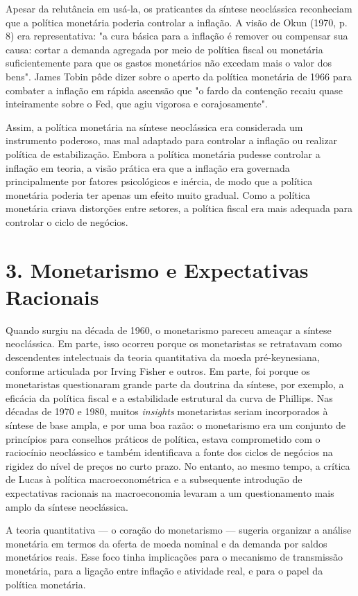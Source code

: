 \documentclass[12pt]{article}
\begin{document}
Apesar da relutância em usá-la, os praticantes da síntese neoclássica reconheciam que a política monetária poderia controlar a inflação. A visão de Okun (1970, p. 8) era representativa: "a cura básica para a inflação é remover ou compensar sua causa: cortar a demanda agregada por meio de política fiscal ou monetária suficientemente para que os gastos monetários não excedam mais o valor dos bens". James Tobin pôde dizer sobre o aperto da política monetária de 1966 para combater a inflação em rápida ascensão que "o fardo da contenção recaiu quase inteiramente sobre o Fed, que agiu vigorosa e corajosamente".

Assim, a política monetária na síntese neoclássica era considerada um instrumento poderoso, mas mal adaptado para controlar a inflação ou realizar política de estabilização. Embora a política monetária pudesse controlar a inflação em teoria, a visão prática era que a inflação era governada principalmente por fatores psicológicos e inércia, de modo que a política monetária poderia ter apenas um efeito muito gradual. Como a política monetária criava distorções entre setores, a política fiscal era mais adequada para controlar o ciclo de negócios.

\section{3. Monetarismo e Expectativas Racionais}

Quando surgiu na década de 1960, o monetarismo pareceu ameaçar a síntese neoclássica. Em parte, isso ocorreu porque os monetaristas se retratavam como descendentes intelectuais da teoria quantitativa da moeda pré-keynesiana, conforme articulada por Irving Fisher e outros. Em parte, foi porque os monetaristas questionaram grande parte da doutrina da síntese, por exemplo, a eficácia da política fiscal e a estabilidade estrutural da curva de Phillips. Nas décadas de 1970 e 1980, muitos \textit{insights} monetaristas seriam incorporados à síntese de base ampla, e por uma boa razão: o monetarismo era um conjunto de princípios para conselhos práticos de política, estava comprometido com o raciocínio neoclássico e também identificava a fonte dos ciclos de negócios na rigidez do nível de preços no curto prazo. No entanto, ao mesmo tempo, a crítica de Lucas à política macroeconométrica e a subsequente introdução de expectativas racionais na macroeconomia levaram a um questionamento mais amplo da síntese neoclássica.

A teoria quantitativa — o coração do monetarismo — sugeria organizar a análise monetária em termos da oferta de moeda nominal e da demanda por saldos monetários reais. Esse foco tinha implicações para o mecanismo de transmissão monetária, para a ligação entre inflação e atividade real, e para o papel da política monetária.
\end{document}
